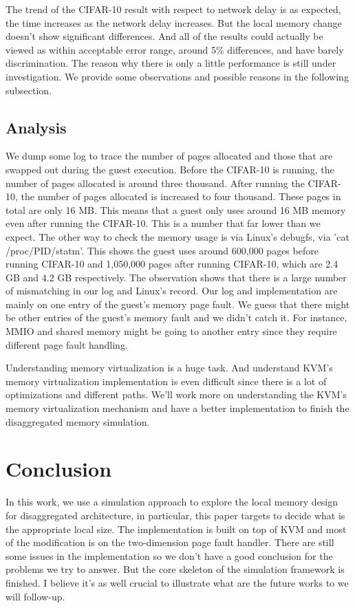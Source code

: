 \documentclass[twocolumn]{article}
\begin{document}
The trend of the CIFAR-10 result with respect to network delay is as expected, the time increases as the network delay increases. But the local memory change doesn't show significant differences. And all of the results could actually be viewed as within acceptable error range, around 5\% differences, and have barely discrimination. The reason why there is only a little performance is still under investigation. We provide some observations and possible reasons in the following subsection.
                                         
\subsection{Analysis}                                 
We dump some log to trace the number of pages allocated and those that are swapped out during the guest execution. Before the CIFAR-10 is running, the number of pages allocated is around three thousand. After running the CIFAR-10, the number of pages allocated is increased to four thousand. These pages in total are only 16 MB. This means that a guest only uses around 16 MB memory even after running the CIFAR-10. This is a number that far lower than we expect. The other way to check the memory usage is via Linux's debugfs, via 'cat /proc/PID/statm'. This shows the guest uses around 600,000 pages before running CIFAR-10 and 1,050,000 pages after running CIFAR-10, which are 2.4 GB and 4.2 GB respectively.                                         
The observation shows that there is a large number of mismatching in our log and Linux's record. Our log and implementation are mainly on one entry of the guest's memory page fault. We guess that there might be other entries of the guest's memory fault and we didn't catch it. For instance, MMIO and shared memory might be going to another entry since they require different page fault handling.
                                         
Understanding memory virtualization is a huge task. And understand KVM's memory virtualization implementation is even difficult since there is a lot of optimizations and different paths. We'll work more on understanding the KVM's memory virtualization mechanism and have a better implementation to finish the disaggregated memory simulation.
                                         
\section{Conclusion}                                 
In this work, we use a simulation approach to explore the local memory design for disaggregated architecture, in particular, this paper targets to decide what is the appropriate local size. The implementation is built on top of KVM and most of the modification is on the two-dimension page fault handler. There are still some issues in the implementation so we don't have a good conclusion for the problems we try to answer. But the core skeleton of the simulation framework is finished. I believe it's as well crucial to illustrate what are the future works to we will follow-up.
                                         
\end{document}
